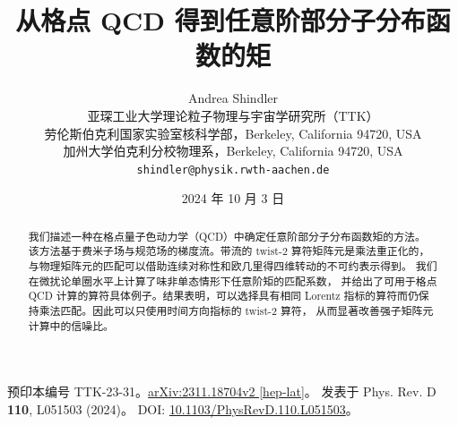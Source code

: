 \documentclass[11pt]{ctexart}
\title{从格点 QCD 得到任意阶部分子分布函数的矩}
\author{Andrea Shindler\\[2pt]
\small 亚琛工业大学理论粒子物理与宇宙学研究所（TTK）\\
\small 劳伦斯伯克利国家实验室核科学部，Berkeley, California 94720, USA\\
\small 加州大学伯克利分校物理系，Berkeley, California 94720, USA\\
\small \texttt{shindler@physik.rwth-aachen.de}}
\date{2024 年 10 月 3 日}
\begin{document}
\maketitle

\noindent
\small 预印本编号 TTK-23-31。\href{https://arxiv.org/abs/2311.18704}{arXiv:2311.18704v2 [hep-lat]}。
发表于 Phys. Rev. D \textbf{110}, L051503 (2024)。
DOI: \href{https://doi.org/10.1103/PhysRevD.110.L051503}{10.1103/PhysRevD.110.L051503}。
\normalsize

\begin{abstract}
\noindent
我们描述一种在格点量子色动力学（QCD）中确定任意阶部分子分布函数矩的方法。
该方法基于费米子场与规范场的梯度流。带流的 twist-2 算符矩阵元是乘法重正化的，
与物理矩阵元的匹配可以借助连续对称性和欧几里得四维转动的不可约表示得到。
我们在微扰论单圈水平上计算了味非单态情形下任意阶矩的匹配系数，
并给出了可用于格点 QCD 计算的算符具体例子。结果表明，可以选择具有相同
Lorentz 指标的算符而仍保持乘法匹配。因此可以只使用时间方向指标的 twist-2 算符，
从而显著改善强子矩阵元计算中的信噪比。
\end{abstract}









\end{document}
